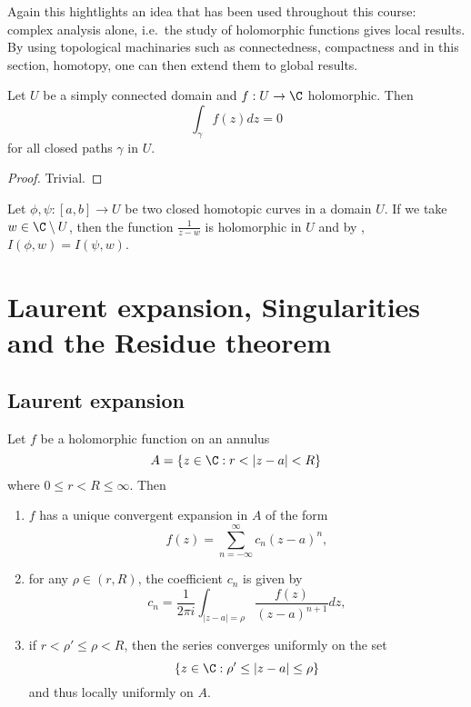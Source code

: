 \documentclass[a4paper]{article}
\begin{document}
Again this hightlights an idea that has been used throughout this course: complex analysis alone, i.e.\ the study of holomorphic functions gives local results. By using topological machinaries such as connectedness, compactness and in this section, homotopy, one can then extend them to global results.

\begin{corollary}
  Let \(U\) be a simply connected domain and \(f: U \to \C\) holomorphic. Then
  \[
    \int_\gamma f(z)dz = 0
  \]
  for all closed paths \(\gamma\) in \(U\).
\end{corollary}

\begin{proof}
  Trivial.
\end{proof}

\begin{remark}
  Let \(\phi, \psi: [a, b] \to U\) be two closed homotopic curves in a domain \(U\). If we take \(w \in \C \setminus U\), then the function \(\frac{1}{z - w}\) is holomorphic in \(U\) and by , \(I(\phi, w) = I(\psi, w)\).
\end{remark}

\section{Laurent expansion, Singularities and the Residue theorem}

\subsection{Laurent expansion}

\begin{theorem}
  Let \(f\) be a holomorphic function on an annulus
  \[
    A = \{z \in \C: r < |z - a| < R\}
  \]
  where \(0 \leq r < R \leq \infty\). Then
  \begin{enumerate}
  \item \(f\) has a unique convergent expansion in \(A\) of the form
    \begin{equation}
      \label{eqn:Laurent}
      f(z) = \sum_{n = -\infty}^\infty c_n(z - a)^n,
      \tag{\(\ast\)}
    \end{equation}
  \item for any \(\rho \in (r, R)\), the coefficient \(c_n\) is given by
    \[
      c_n = \frac{1}{2\pi i} \int_{|z - a| = \rho} \frac{f(z)}{(z - a)^{n + 1}} dz,
    \]
  \item if \(r < \rho' \leq \rho < R\), then the series converges uniformly on the set
    \[
      \{z \in \C: \rho' \leq |z - a| \leq \rho\}
    \]
    and thus locally uniformly on \(A\).
  \end{enumerate}
\end{theorem}
\end{document}
